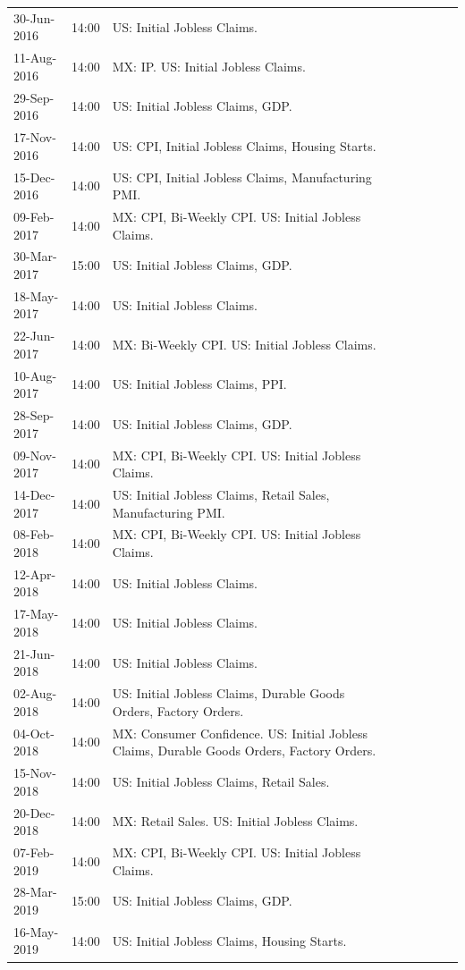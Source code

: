 \documentclass[a4paper,12pt]{article} 		%
\begin{document}
\begin{tiny}
\begin{center}
\begin{longtable}{p{1.8cm}p{1cm}p{11.7cm}p{1.8cm}p{1cm}p{11.7cm}p{1.8cm}p{1cm}p{11.7cm}}
			30-Jun-2016 & 14:00 & US: Initial Jobless Claims. \\
			11-Aug-2016 & 14:00 & MX: IP. US: Initial Jobless Claims. \\
			29-Sep-2016 & 14:00 & US: Initial Jobless Claims, GDP. \\
			17-Nov-2016 & 14:00 & US: CPI, Initial Jobless Claims, Housing Starts. \\
			15-Dec-2016 & 14:00 & US: CPI, Initial Jobless Claims, Manufacturing PMI. \\
			09-Feb-2017 & 14:00 & MX: CPI, Bi-Weekly CPI. US: Initial Jobless Claims. \\
			30-Mar-2017 & 15:00 & US: Initial Jobless Claims, GDP. \\
			18-May-2017 & 14:00 & US: Initial Jobless Claims. \\
			22-Jun-2017 & 14:00 & MX: Bi-Weekly CPI. US: Initial Jobless Claims. \\
			10-Aug-2017 & 14:00 & US: Initial Jobless Claims, PPI. \\
			28-Sep-2017 & 14:00 & US: Initial Jobless Claims, GDP. \\
			09-Nov-2017 & 14:00 & MX: CPI, Bi-Weekly CPI. US: Initial Jobless Claims. \\
			14-Dec-2017 & 14:00 & US: Initial Jobless Claims, Retail Sales, Manufacturing PMI. \\
			08-Feb-2018 & 14:00 & MX: CPI, Bi-Weekly CPI. US: Initial Jobless Claims. \\
			12-Apr-2018 & 14:00 & US: Initial Jobless Claims. \\
			17-May-2018 & 14:00 & US: Initial Jobless Claims. \\
			21-Jun-2018 & 14:00 & US: Initial Jobless Claims. \\
			02-Aug-2018 & 14:00 & US: Initial Jobless Claims, Durable Goods Orders, Factory Orders. \\
			04-Oct-2018 & 14:00 & MX: Consumer Confidence. US: Initial Jobless Claims, Durable Goods Orders, Factory Orders. \\
			15-Nov-2018 & 14:00 & US: Initial Jobless Claims, Retail Sales. \\
			20-Dec-2018 & 14:00 & MX: Retail Sales. US: Initial Jobless Claims. \\
			07-Feb-2019 & 14:00 & MX: CPI, Bi-Weekly CPI. US: Initial Jobless Claims. \\
			28-Mar-2019 & 15:00 & US: Initial Jobless Claims, GDP. \\
			16-May-2019 & 14:00 & US: Initial Jobless Claims, Housing Starts. \\

\end{longtable}
\end{center}
\end{tiny}
\end{document}
